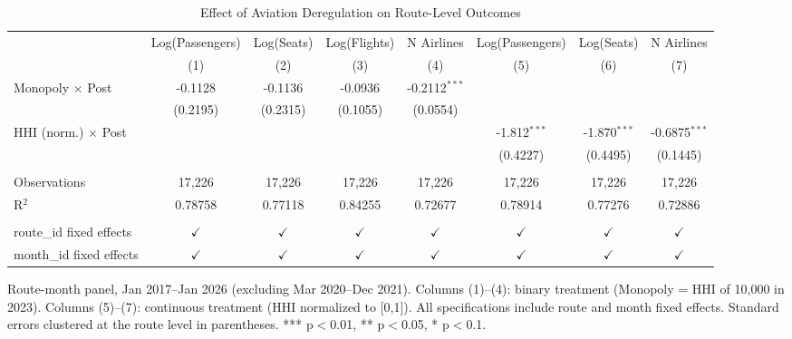 
\begin{table}[htbp]
   \caption{\label{tab:main} Effect of Aviation Deregulation on Route-Level Outcomes}
   \bigskip
   \centering
   \begin{adjustbox}{max width=\textwidth}
   \begin{tabular}{lccccccc}
      \toprule
                                 & Log(Passengers) & Log(Seats)    & Log(Flights)  & N Airlines      & Log(Passengers) & Log(Seats)     & N Airlines\\  
                                 & (1)             & (2)           & (3)           & (4)             & (5)             & (6)            & (7)\\
      \midrule 
      Monopoly $\times$ Post     & -0.1128         & -0.1136       & -0.0936       & -0.2112$^{***}$ &                 &                &   \\   
                                 & (0.2195)        & (0.2315)      & (0.1055)      & (0.0554)        &                 &                &   \\   
      HHI (norm.) $\times$ Post  &                 &               &               &                 & -1.812$^{***}$  & -1.870$^{***}$ & -0.6875$^{***}$\\   
                                 &                 &               &               &                 & (0.4227)        & (0.4495)       & (0.1445)\\   
       \\
      Observations               & 17,226          & 17,226        & 17,226        & 17,226          & 17,226          & 17,226         & 17,226\\  
      R$^2$                      & 0.78758         & 0.77118       & 0.84255       & 0.72677         & 0.78914         & 0.77276        & 0.72886\\  
       \\
      route\_id fixed effects    & $\checkmark$    & $\checkmark$  & $\checkmark$  & $\checkmark$    & $\checkmark$    & $\checkmark$   & $\checkmark$\\   
      month\_id fixed effects    & $\checkmark$    & $\checkmark$  & $\checkmark$  & $\checkmark$    & $\checkmark$    & $\checkmark$   & $\checkmark$\\   
      \bottomrule
   \end{tabular}
   \end{adjustbox}

   \par \raggedright 
   Route-month panel, Jan 2017--Jan 2026 (excluding Mar 2020--Dec 2021). Columns (1)--(4): binary treatment (Monopoly = HHI of 10,000 in 2023). Columns (5)--(7): continuous treatment (HHI normalized to [0,1]). All specifications include route and month fixed effects. Standard errors clustered at the route level in parentheses. *** p$<$0.01, ** p$<$0.05, * p$<$0.1.
\end{table}


